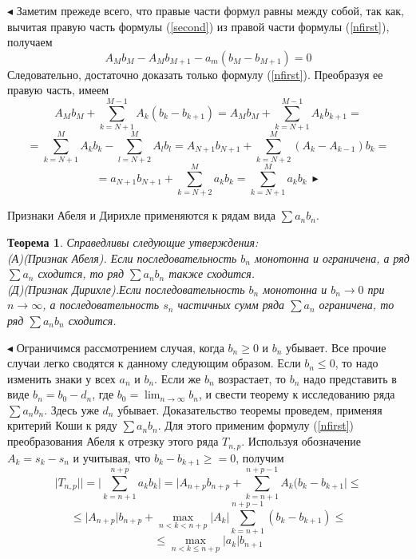 \documentclass[12pt,titlepage]{report}
\newtheorem{theorem}{Теорема}
\begin{document}
$\blacktriangleleft$ Заметим прежеде всего, что правые части формул равны между собой, так как, вычитая правую часть формулы (\ref{second}) из правой части формулы (\ref{nfirst}), получаем
$$A_{M}b_{M}-A_{M}b_{M+1}-a_{m}(b_{M}-b_{M+1})=0$$
Следовательно, достаточно доказать только формулу (\ref{nfirst}). Преобразуя ее правую часть, имеем
$$A_{M}b_{M}+\sum_{k=N+1}^{M-1}A_{k}(b_{k}-b_{k+1})=A_{M}b_{M}+\sum_{k=N+1}^{M-1}A_{k}b_{k+1}=$$
$$=\sum_{k=N+1}^M A_{k}b_{k}-\sum_{l=N+2}^M A_{l}b_{l}=A_{N+1}b_{N+1}+\sum_{k=N+2}^{M}(A_k-A_{k-1})b_k=$$
$$=a_{N+1}b_{N+1}+\sum_{k=N+2}^{M}a_kb_k=\sum_{k=N+1}^{M}a_kb_k\ \blacktriangleright$$

Признаки Абеля и Дирихле применяются к рядам вида $\sum a_nb_n.$

\begin{theorem}
Справедливы следующие утверждения:\\
(А)(Признак Абеля). Если последовательность $b_n$ монотонна и ограничена, а ряд $\sum a_n$ сходится, то ряд $\sum a_nb_n$ также сходится.\\
(Д)(Признак Дирихле).Если последовательность $b_n$ монотонна и $b_n\to0$ при $n\to \infty$, а последовательность $s_n$ частичных сумм ряда $\sum a_n$ ограничена, то ряд $\sum a_nb_n$ сходится.
\end{theorem}

$\blacktriangleleft$ Ограничимся рассмотрением случая, когда $b_n\ge0$ и $b_n$ убывает. Все прочие случаи легко сводятся к данному следующим образом. Если $b_n\le0$, то надо изменить знаки у всех $a_n$ и $b_n$. Если же $b_n$ возрастает, то $b_n$ надо представить в виде $b_n=b_0-d_n$, где $b_0=\lim_{n\to\infty}b_n$, и свести теорему к исследованию ряда $\sum a_nb_n$. Здесь уже $d_n$ убывает.
Доказательство теоремы проведем, применяя критерий Коши к ряду $\sum a_nb_n$. Для этого применим формулу (\ref{nfirst}) преобразования Абеля к отрезку этого ряда $T_{n,p}$. Используя обозначение $A_k=s_k-s_n$ и учитывая, что $b_k-b_{k+1}\ge=0$, получим
$$\bigl|T_{n,p}|\bigr|=\Biggl|\sum_{k=n+1}^{n+p}a_kb_k\Biggr|=\Biggl|A_{n+p}b_{n+p}+\sum_{k=n+1}^{n+p-1}A_k(b_k-b_{k+1}\Biggr|\le$$
$$\le \bigl|A_{n+p}\bigr|b_{n+p}+\max_{n<k<n+p}\bigl|A_k\bigr|\sum_{k=n+1}^{n+p-1}(b_k-b_{k+1})\le$$
$$\le\max_{n<k\le n+p}\bigl|a_k\bigr|b_{n+1}$$
\end{document}
